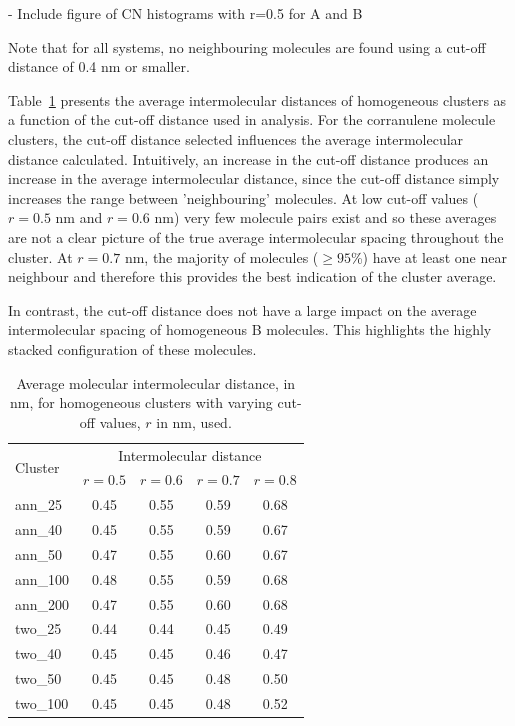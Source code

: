 - Include figure of CN histograms with r=0.5 for A and B

Note that for all systems, no neighbouring molecules are found using a cut-off distance of 0.4 nm or smaller.


Table~\ref{tableSI:intermolecdistscutoff} presents the average intermolecular distances of homogeneous clusters as a function of the cut-off distance used in analysis. For the corranulene molecule clusters, the cut-off distance selected influences the average intermolecular distance calculated.  Intuitively, an increase in the cut-off distance produces an increase in the average intermolecular distance, since the cut-off distance simply increases the range between 'neighbouring' molecules. At low cut-off values ($r = 0.5$ nm and $r = 0.6$ nm) very few molecule pairs exist and so these averages are not a clear picture of the true average intermolecular spacing throughout the cluster.  At $r = 0.7$ nm, the majority of molecules ($\ge 95$\%) have at least one near neighbour and therefore this provides the best indication of the cluster average.

In contrast, the cut-off distance does not have a large impact on the average intermolecular spacing of homogeneous B molecules. This highlights the highly stacked configuration of these molecules.




% 
\begin{table}[]
\centering
\caption{Average molecular intermolecular distance, in nm, for homogeneous clusters with varying cut-off values, $r$ in nm, used.}
\label{tableSI:intermolecdistscutoff}
\begin{tabular}{lcccc}
\hline
\multicolumn{1}{l}{\multirow{2}{*}{Cluster}} & \multicolumn{4}{c}{\multirow{1}{*}{Intermolecular distance}} \\
 & $r = 0.5$ & $r = 0.6$ & $r = 0.7$ & $r = 0.8$ \\ \hline
ann\_25 & 0.45 & 0.55 & 0.59 & 0.68 \\
ann\_40 & 0.45 & 0.55 & 0.59 & 0.67 \\
ann\_50 & 0.47 & 0.55 & 0.60 & 0.67 \\
ann\_100 & 0.48 & 0.55 & 0.59 & 0.68 \\
ann\_200 & 0.47 & 0.55 & 0.60 & 0.68 \\ \hline
two\_25 & 0.44 & 0.44 & 0.45 & 0.49 \\
two\_40 & 0.45 & 0.45 & 0.46 & 0.47 \\
two\_50 & 0.45 & 0.45 & 0.48 & 0.50 \\ 
two\_100 & 0.45 & 0.45 & 0.48 & 0.52 \\ \hline
\end{tabular}
\end{table}
%





